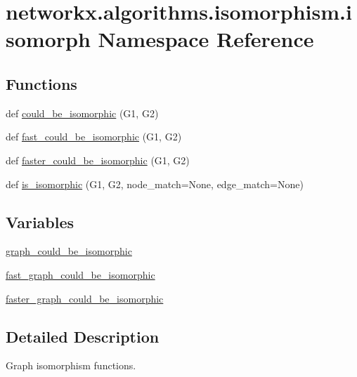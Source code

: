 \hypertarget{namespacenetworkx_1_1algorithms_1_1isomorphism_1_1isomorph}{}\section{networkx.\+algorithms.\+isomorphism.\+isomorph Namespace Reference}
\label{namespacenetworkx_1_1algorithms_1_1isomorphism_1_1isomorph}
\subsection*{Functions}
\begin{DoxyCompactItemize}
\item 
def \hyperlink{namespacenetworkx_1_1algorithms_1_1isomorphism_1_1isomorph_acd8e52946a8e1eb4edfa680004493abc}{could\+\_\+be\+\_\+isomorphic} (G1, G2)
\item 
def \hyperlink{namespacenetworkx_1_1algorithms_1_1isomorphism_1_1isomorph_a653f0e5f4f9bd1c131901c327bfc4f4a}{fast\+\_\+could\+\_\+be\+\_\+isomorphic} (G1, G2)
\item 
def \hyperlink{namespacenetworkx_1_1algorithms_1_1isomorphism_1_1isomorph_a40d948a8ea317549e4715308785cd33d}{faster\+\_\+could\+\_\+be\+\_\+isomorphic} (G1, G2)
\item 
def \hyperlink{namespacenetworkx_1_1algorithms_1_1isomorphism_1_1isomorph_a7f9257d6b4a3d4c8f699207d22f26d93}{is\+\_\+isomorphic} (G1, G2, node\+\_\+match=None, edge\+\_\+match=None)
\end{DoxyCompactItemize}
\subsection*{Variables}
\begin{DoxyCompactItemize}
\item 
\hyperlink{namespacenetworkx_1_1algorithms_1_1isomorphism_1_1isomorph_a444e1dc45d1dfea624af3a970e4bd562}{graph\+\_\+could\+\_\+be\+\_\+isomorphic}
\item 
\hyperlink{namespacenetworkx_1_1algorithms_1_1isomorphism_1_1isomorph_a8eef774439e10f84cd06553330fa865b}{fast\+\_\+graph\+\_\+could\+\_\+be\+\_\+isomorphic}
\item 
\hyperlink{namespacenetworkx_1_1algorithms_1_1isomorphism_1_1isomorph_a7a4ac5fcd6db4ffb2e8c84fcac567014}{faster\+\_\+graph\+\_\+could\+\_\+be\+\_\+isomorphic}
\end{DoxyCompactItemize}


\subsection{Detailed Description}
\begin{DoxyVerb}Graph isomorphism functions.
\end{DoxyVerb}
 

